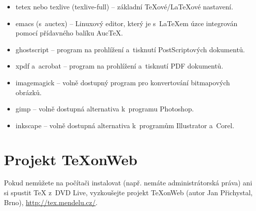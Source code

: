 \begin{itemize}
\item tetex nebo texlive (texlive-full) -- základní \TeX ové/\LaTeX ové nastavení.
\item emacs (s~auctex) -- Linuxový editor, který je s~\LaTeX em úzce integrován pomocí přídavného balíku Auc\TeX.
\item ghostscript -- program na prohlížení a~tisknutí PostScriptových dokumentů.
\item xpdf a~acrobat -- program na prohlížení a~tisknutí PDF dokumentů.
\item imagemagick -- volně dostupný program pro konvertování bitmapových obrázků.
\item gimp -- volně dostupná alternativa k~programu Photoshop.
\item inkscape -- volně dostupná alternativa k~programům Illustrator a~Corel.
\end{itemize}

\section{Projekt \TeX onWeb}

Pokud nemůžete na počítači instalovat (např. nemáte administrátorská práva) ani si spustit \TeX{} z~DVD Live, vyzkoušejte projekt \TeX onWeb (autor Jan Přichystal, Brno), \url{http://tex.mendelu.cz/}.


